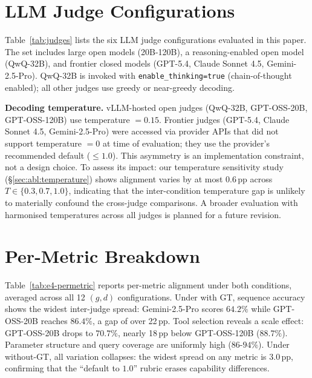 \section{LLM Judge Configurations}
\label{app:judges}

Table~\ref{tab:judges} lists the six LLM judge configurations evaluated in this paper. The set includes large open models (20B-120B), a reasoning-enabled open model (QwQ-32B), and frontier closed models (GPT-5.4, Claude Sonnet 4.5, Gemini-2.5-Pro). QwQ-32B is invoked with \texttt{enable\_thinking=true} (chain-of-thought enabled); all other judges use greedy or near-greedy decoding.

\textbf{Decoding temperature.} vLLM-hosted open judges (QwQ-32B, GPT-OSS-20B, GPT-OSS-120B) use temperature $=0.15$. Frontier judges (GPT-5.4, Claude Sonnet 4.5, Gemini-2.5-Pro) were accessed via provider APIs that did not support temperature $=0$ at time of evaluation; they use the provider's recommended default ($\leq 1.0$). This asymmetry is an implementation constraint, not a design choice. To assess its impact: our temperature sensitivity study (\S\ref{sec:abl:temperature}) shows alignment varies by at most $0.6$\,pp across $T \in \{0.3, 0.7, 1.0\}$, indicating that the inter-condition temperature gap is unlikely to materially confound the cross-judge comparisons. A broader evaluation with harmonised temperatures across all judges is planned for a future revision.


\section{Per-Metric Breakdown}
\label{app:permetric-table}

Table~\ref{tab:e4-permetric} reports per-metric alignment under both
conditions, averaged across all 12 $(g, d)$ configurations. Under with GT,
sequence accuracy shows the widest inter-judge spread: Gemini-2.5-Pro
scores $64.2\%$ while GPT-OSS-20B reaches $86.4\%$, a gap of over 22\,pp.
Tool selection reveals a scale effect: GPT-OSS-20B drops to $70.7\%$,
nearly 18\,pp below GPT-OSS-120B ($88.7\%$). Parameter structure and query
coverage are uniformly high ($86$-$94\%$). Under without-GT, all variation
collapses: the widest spread on any metric is $3.0$\,pp, confirming that
the ``default to $1.0$'' rubric erases capability differences.

